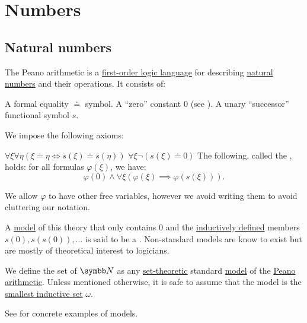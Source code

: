 \section{Numbers}\label{sec:numbers}
\subsection{Natural numbers}\label{subsec:natural_numbers}

\begin{definition}\label{def:peano_arithmetic}
  The Peano arithmetic is a \hyperref[def:first_order_logic_language]{first-order logic language} for describing \hyperref[def:natural_numbers]{natural numbers} and their operations. It consists of:
  \begin{DefEnum}
     A formal equality \( \doteq \) symbol.
     A \enquote{zero} constant \( 0 \) (see ).
     A unary \enquote{successor} functional symbol \( s \).
  \end{DefEnum}

  We impose the following axioms:
  \begin{DefEnum}
     \( \forall \xi \forall \eta (\xi \doteq \eta \iff s(\xi) \doteq s(\eta)) \)
     \( \forall \xi \neg (s(\xi) \doteq 0) \)
     The following, called the , holds: for all formulas \( \varphi(\xi) \), we have:
    \begin{equation*}
      \varphi(0) \wedge \forall \xi (\varphi(\xi) \implies \varphi(s(\xi))).
    \end{equation*}

    We allow \( \varphi \) to have other free variables, however we avoid writing them to avoid cluttering our notation.
  \end{DefEnum}

  A \hyperref[def:first_order_model]{model} of this theory that only contains \( 0 \) and the \hyperref[remark:induction]{inductively defined} members \( s(0), s(s(0)), \ldots \) is said to be a . Non-standard models are know to exist but are mostly of theoretical interest to logicians.
\end{definition}

\begin{definition}\label{def:natural_numbers}
  We define the set of  \( \BN \) as any \hyperref[sec:set_theory]{set-theoretic} standard \hyperref[def:first_order_model]{model} of the \hyperref[def:peano_arithmetic]{Peano arithmetic}. Unless mentioned otherwise, it is safe to assume that the model is the \hyperref[ex:natural_numbers_models/omega]{smallest inductive set} \( \omega \).

  See  for concrete examples of models.
\end{definition}


